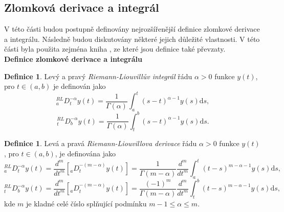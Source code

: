 \documentclass[a4paper,12pt,twoside]{article}
\theoremstyle{definition}
\newtheorem{defin}[veta]{Definice}
\theoremstyle{remark}
\numberwithin{equation}{section}
\numberwithin{table}{section}
\numberwithin{figure}{section}
\newcommand{\dx}[1]{\mathrm{d} #1}
\begin{document}
\subsection{Zlomková derivace a integrál}
	V této části budou postupně definovány nejrozšířenější definice zlomkové derivace a integrálu. Následně budou diskutovány některé jejich důležité vlastnosti. V této části byla použita zejména kniha \cite{Cangpin}, ze které jsou definice také převzaty.\\
\textbf{Definice zlomkové derivace a integrálu}

\begin{defin}
	Levý a pravý \emph{Riemann-Liouvillův integrál} řádu $\alpha > 0$ funkce $y\left(t\right)$, pro $t \in \left(a,b\right)$ je definován jako
	\begin{equation} \label{RiemannIntegral}
	^{RL}_{a}D_{t}^{-\alpha} y\left( t\right)  = \frac{1}{\Gamma \left( \alpha\right)} \int_{a}^{t} \left( s-t \right)^{\alpha -1} y\left( s\right)  \dx s, 
\end{equation}	
	$$ ^{RL}_{t}D_{b}^{-\alpha} y\left( t\right)  = \frac{1}{\Gamma \left( \alpha\right)} \int_{t}^{b} \left( s-t \right)^{\alpha -1} y\left( s\right)  \dx s. $$
\end{defin}

\begin{defin} %
	Levá a pravá \emph{Riemann-Liouvillova derivace} řádu $\alpha > 0 $ funkce $y\left(t\right)$, pro $t \in \left(a, b\right)$, je definována jako
	$$
		{^{RL}_{a}D_{t}^{-\alpha} y\left( t\right)} = \frac{d^{m}}{dt^{m}} \left[_{a}D^{-\left(m-\alpha\right)}_{t} y\left(t\right)\right] = {\frac{1}{\Gamma \left( m -\alpha \right)}} {\frac{d^{m}}{dt^m}} \int_{a}^{t} \left(t-s\right)^{m-\alpha-1} y\left(s\right)\dx{s},
	$$
	$$
	{^{RL}_{t}D_{b}^{-\alpha} y\left( t\right)} = \frac{d^{m}}{dt^{m}} \left[_{a}D^{-\left(m-\alpha\right)}_{t} y\left(t\right)\right] = 		{\frac{\left(-1\right)^{m}}{\Gamma \left( m -\alpha \right)}} {\frac{d^{m}}{dt^m}} \int_{t}^{b} \left(t-s\right)^{m-\alpha-1} y\left(s\right)\dx{s},
	$$
kde $m$ je kladné celé  číslo splňující podmínku $m-1 \leq \alpha \leq m$.
\end{defin}
\end{document}
